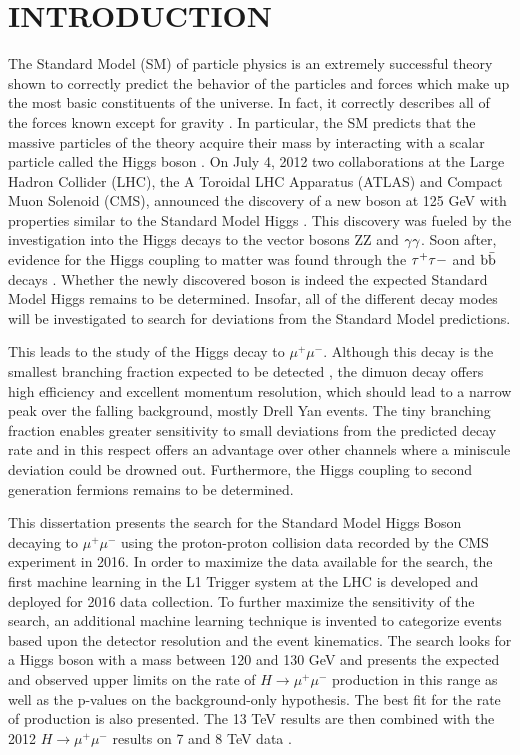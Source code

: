 \chapter{INTRODUCTION} \label{intro}

The Standard Model (SM) of particle physics is an extremely successful theory shown to correctly predict the behavior of the particles and forces which make up the most basic constituents of the universe. In fact, it correctly describes all of the forces known except for gravity \cite{smnograv}. In particular, the SM predicts that the massive particles of the theory acquire their mass by interacting with a scalar particle called the Higgs boson \cite{higgs1,higgs2,higgs3,qftam}. On July 4, 2012 two collaborations at the Large Hadron Collider (LHC), the A Toroidal LHC Apparatus (ATLAS) and Compact Muon Solenoid (CMS), announced the discovery of a new boson at 125 GeV with properties similar to the Standard Model Higgs \cite{atlasdiscovery,cmsdiscovery2012,cmsdiscovery2013}. This discovery was fueled by the investigation into the Higgs decays to the vector bosons ZZ and ${\rm \gamma\gamma}$. Soon after, evidence for the Higgs coupling to matter was found through the ${\rm \tau^{+}\tau{-}}$ and ${\rm b\bar{b}}$ decays \cite{cmshiggstau,cmshiggsbb,cmshiggsferm,atlashiggsbb}. Whether the newly discovered boson is indeed the expected Standard Model Higgs remains to be determined. Insofar, all of the different decay modes will be investigated to search for deviations from the Standard Model predictions.

This leads to the study of the Higgs decay to $\mu^{+}\mu^{-}$. Although this decay is the smallest branching fraction expected to be detected \cite{smallestbranch1,smallestbranch2}, the dimuon decay offers high efficiency and excellent momentum resolution, which should lead to a narrow peak over the falling background, mostly Drell Yan events. The tiny branching fraction enables greater sensitivity to small deviations from the predicted decay rate and in this respect offers an advantage over other channels where a miniscule deviation could be drowned out. Furthermore, the Higgs coupling to second generation fermions remains to be determined. 

This dissertation presents the search for the Standard Model Higgs Boson decaying to $\mu^{+}\mu^{-}$ using the proton-proton collision data recorded by the CMS experiment in 2016. In order to maximize the data available for the search, the first machine learning in the L1 Trigger system at the LHC is developed and deployed for 2016 data collection. To further maximize the sensitivity of the search, an additional machine learning technique is invented to categorize events based upon the detector resolution and the event kinematics. The search looks for a Higgs boson with a mass between 120 and 130 GeV and presents the expected and observed upper limits on the rate of $H\rightarrow\mu^+\mu^-$ production in this range as well as the p-values on the background-only hypothesis. The best fit for the rate of production is also presented. The 13 TeV results are then combined with the 2012 $H\rightarrow\mu^+\mu^-$ results on 7 and 8 TeV data \cite{cmshiggsmumu2012}.  

